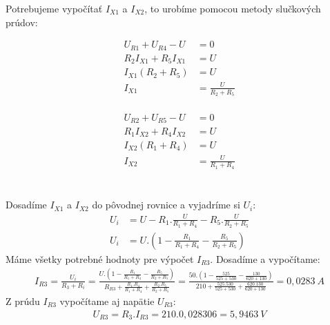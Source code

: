 Potrebujeme vypočítať $I_{X1}$ a $I_{X2}$, to urobíme pomocou metody slučkových prúdov:\\
\begin{minipage}{0.5\linewidth}
\begin{align*}
    U_{R1} + U_{R4} - U &= 0 \\
    R_{2}I_{X1} + R_{5}I_{X1} &= U \\
    I_{X1}(R_{2} + R_{5}) &= U \\
    I_{X1} &= \frac{U}{R_{2} + R_{5}} \\
\end{align*}
\end{minipage}
\begin{minipage}{0.45\linewidth}
\begin{align*}
    U_{R2} + U_{R5} - U &= 0 \\
    R_{1}I_{X2} + R_{4}I_{X2} &= U \\
    I_{X2}(R_{1} + R_{4}) &= U \\
    I_{X2} &= \frac{U}{R_{1} + R_{4}} \\
\end{align*}
\end{minipage}
\\
Dosadíme $I_{X1}$ a $I_{X2}$ do pôvodnej rovnice a vyjadríme si $U_{i}$: 
\begin{align*}
  U_{i} &= U - R_{1}.\frac{U}{R_{1} + R_{4}} - R_{5}.\frac{U}{R_{2} + R_{5}} \\
  U_{i} &= U . \left(1 - \frac{R_{1}}{R_{1} + R_{4}} - \frac{R_{5}}{R_{2} + R_{5}}\right)
\end{align*}
Máme všetky potrebné hodnoty pre výpočet $I_{R3}$. Dosadíme a vypočítame:
\begin{align*}
I_{R3} = \frac{U_{i}}{R_{3} + R_{i}} = \frac{U . \left(1 - \frac{R_{1}}{R_{1} + R_{4}} - \frac{R_{5}}{R_{2} + R_{5}}\right)}{R_{R3} + \frac{R_{1} . R_{4}}{R_{1} + R_{4}} + \frac{R_{2} . R_{5}}{R_{2} + R_{5}}} = \frac{50 . \left(1 - \frac{525}{525 + 530} - \frac{130}{620 + 130}\right)}{210 + \frac{525 . 530}{525 + 530} + \frac{620 . 130}{620 + 130}} = 0,0283~A
\end{align*}
Z prúdu $I_{R3}$ vypočítame aj napätie $U_{R3}$: 
\begin{align*}
U_{R3} = R_{3}.I_{R3} = 210.0,028306 = 5,9463~V
\end{align*}
\newpage
